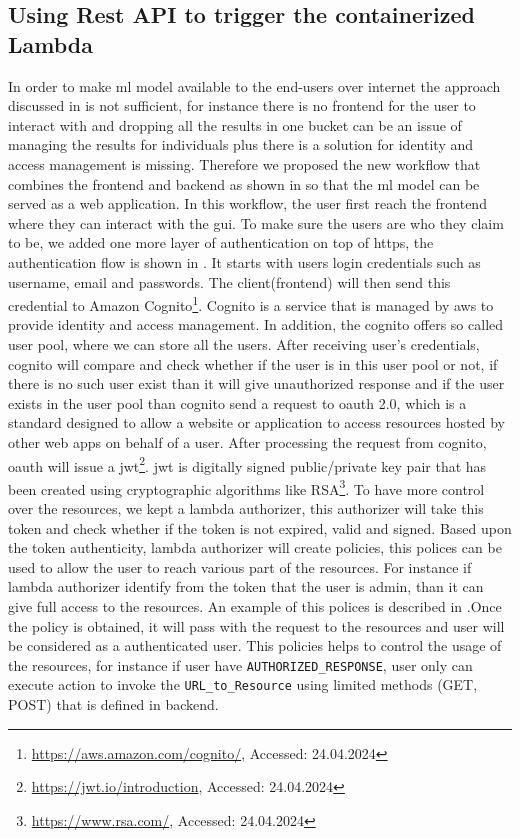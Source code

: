 \subsection{Using Rest API to trigger the containerized Lambda\label{workflow_restapi}}

In order to make \acrshort{ml} model available to the end-users over internet the approach discussed in  is not sufficient, for instance there is no frontend for the user to interact with and dropping all the results in one bucket can be an issue of managing the results for individuals plus there is a solution for identity and access management is missing. Therefore we proposed the new workflow that combines the frontend and backend as shown in  so that the \acrshort{ml} model can be served as a web application. In this workflow, the user first reach the frontend where they can interact with the \acrshort{gui}. To make sure the users are who they claim to be, we added one more layer of authentication on top of \acrshort{https}, the authentication flow is shown in . It starts with users login credentials such as username, email and passwords. The client(frontend) will then send this credential to Amazon Cognito\footnote{\url{https://aws.amazon.com/cognito/}, Accessed: 24.04.2024}. Cognito is a service that is managed by \acrshort{aws} to provide identity and access management. In addition, the cognito offers so called user pool, where we can store all the users. After receiving user's credentials, cognito will compare and check whether if the user is in this user pool or not, if there is no such user exist than it will give unauthorized response and if the user exists in the user pool than cognito send a request to \acrfull{oauth} 2.0, which is a standard designed to allow a website or application to access resources hosted by other web apps on behalf of a user. After processing the request from cognito, \acrshort{oauth} will issue a \acrfull{jwt}\footnote{\url{https://jwt.io/introduction}, Accessed: 24.04.2024}.  \acrshort{jwt} is digitally signed public/private key pair that has been created using cryptographic algorithms like RSA\footnote{\url{https://www.rsa.com/}, Accessed: 24.04.2024}. To have more control over the resources, we kept a lambda authorizer, this authorizer will take this token and check whether if the token is not expired, valid and signed. Based upon the token authenticity, lambda authorizer will create policies, this polices can be used to allow the user to reach various part of the resources. For instance if lambda authorizer identify from the token that the user is admin, than it can give full access to the resources. An example of this polices is described in .Once the policy is obtained, it will pass with the request to the resources and user will be considered as a authenticated user. This policies helps to control the usage of the resources, for instance if user have \verb|AUTHORIZED_RESPONSE|, user only can execute action to invoke the \verb|URL_to_Resource| using limited methods (GET, POST) that is defined in backend. 

